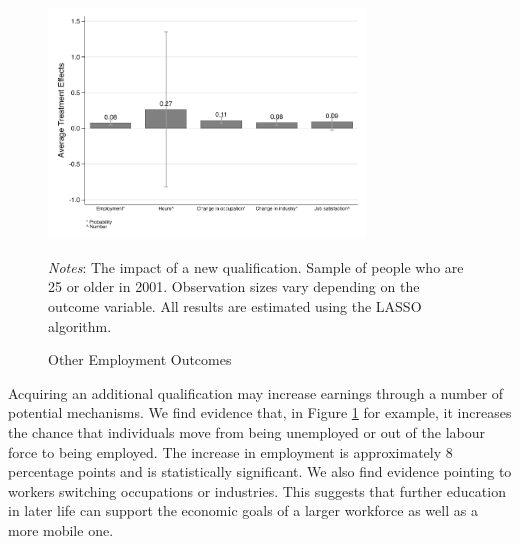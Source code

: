 \documentclass[12pt, a4paper]{article}
\begin{document}
\begin{figure}[htbp]
\singlespacing
\centering
\caption{Other Employment Outcomes}
\vspace{0.5cm}
  \label{fig:empl}
    \includegraphics[width=0.75\textwidth]{_figures/SPRC_fig5_empltr.pdf}
\parbox{1\textwidth}{\footnotesize{\textit{Notes}: The impact of a new qualification. Sample of people who are 25 or older in 2001. Observation sizes vary depending on the outcome variable. All results are estimated using the LASSO algorithm.}}
\doublespacing
\end{figure}

Acquiring an additional qualification may increase earnings through a number of
potential mechanisms. We find evidence that, in Figure \ref{fig:empl} for
example, it increases the chance that individuals move from being unemployed or
out of the labour force to being employed. The increase in employment is
approximately 8 percentage points and is statistically significant. We also
find evidence pointing to workers switching occupations or industries. This
suggests that further education in later life can support the economic goals of
a larger workforce as well as a more mobile one.

%
\end{document}

